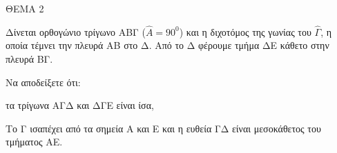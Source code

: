 
ΘΕΜΑ 2

Δίνεται ορθογώνιο τρίγωνο ΑΒΓ ($\widehat{Α} = 90^{0}$) και η διχοτόμος της γωνίας του $\widehat{\Gamma}$, η οποία τέμνει την πλευρά ΑΒ στο Δ. Από το Δ φέρουμε τμήμα ΔΕ κάθετο στην πλευρά ΒΓ.

Να αποδείξετε ότι:

\begin{alist}
\item τα τρίγωνα ΑΓΔ και ΔΓΕ είναι ίσα, 

\item Το Γ ισαπέχει από τα σημεία Α και Ε και η ευθεία ΓΔ είναι μεσοκάθετος του τμήματος ΑΕ. 
\end{alist}
